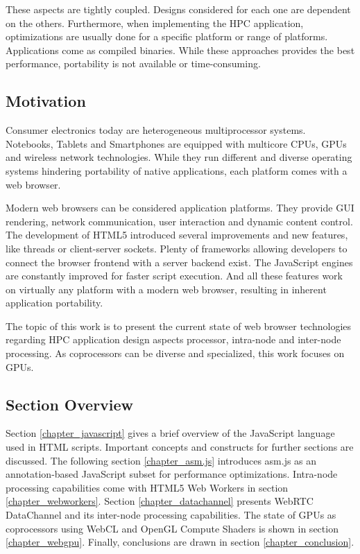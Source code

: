 These aspects are tightly coupled. Designs considered for each one are dependent on the others. Furthermore, when implementing the HPC application, optimizations are usually done for a specific platform or range of platforms. Applications come as compiled binaries. While these approaches provides the best performance, portability is not available or time-consuming.


\subsection{Motivation}

Consumer electronics today are heterogeneous multiprocessor systems. Notebooks, Tablets and Smartphones are equipped with multicore CPUs, GPUs and wireless network technologies. While they run different and diverse operating systems hindering portability of native applications, each platform comes with a web browser.

Modern web browsers can be considered application platforms. They provide GUI rendering, network communication, user interaction and dynamic content control. The development of HTML5 introduced several improvements and new features, like threads or client-server sockets. Plenty of frameworks allowing developers to connect the browser frontend with a server backend exist. The JavaScript engines are constantly improved for faster script execution. And all these features work on virtually any platform with a modern web browser, resulting in inherent application portability.

The topic of this work is to present the current state of web browser technologies regarding HPC application design aspects processor, intra-node and inter-node processing. As coprocessors can be diverse and specialized, this work focuses on GPUs.


\subsection{Section Overview}

Section \ref{chapter_javascript} gives a brief overview of the JavaScript language used in HTML scripts. Important concepts and constructs for further sections are discussed. The following section \ref{chapter_asm.js} introduces asm.js as an annotation-based JavaScript subset for performance optimizations. Intra-node processing capabilities come with HTML5 Web Workers in section \ref{chapter_webworkers}. Section \ref{chapter_datachannel} presents WebRTC DataChannel and its inter-node processing capabilities. The state of GPUs as coprocessors using WebCL and OpenGL Compute Shaders is shown in section \ref{chapter_webgpu}. Finally, conclusions are drawn in section \ref{chapter_conclusion}.

